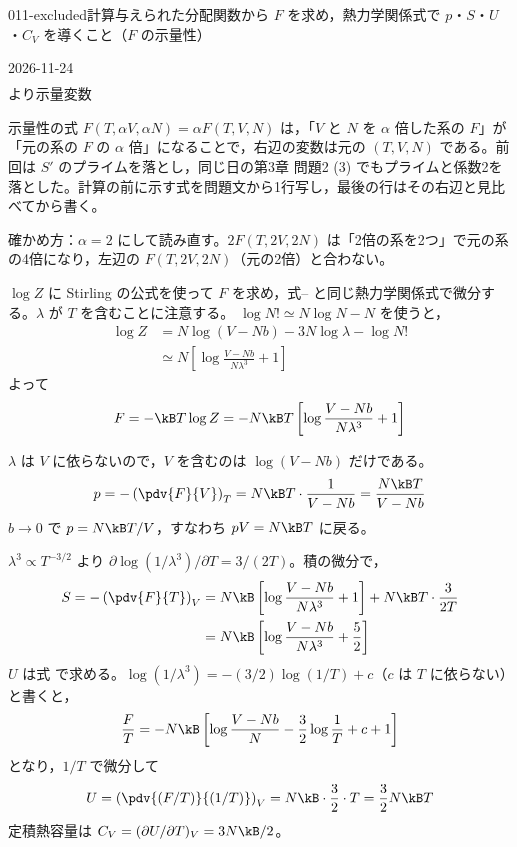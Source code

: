 \documentclass[uplatex,dvipdfmx,a4paper,11pt]{jsarticle}
\begin{document}
\begin{mondai}{011-excluded}{計算}{与えられた分配関数から $F$ を求め，熱力学関係式で $p$・$S$・$U$・$C_{V}$ を導くこと（$F$ の示量性）}
\begin{kotaeutsushi}{2026-11-24}
\begin{align*}
\end{align*}
より示量変数
\end{kotaeutsushi}
\begin{kizuki}
\item {} 示量性の式 $F(T,\alpha V,\alpha N)=\alpha F(T,V,N)$ は，「$V$ と $N$ を $\alpha$ 倍した系の $F$」が「元の系の $F$ の $\alpha$ 倍」になることで，右辺の変数は元の $(T,V,N)$ である。前回は $S'$ のプライムを落とし，同じ日の第3章 問題2 (3) でもプライムと係数2を落とした。計算の前に示す式を問題文から1行写し，最後の行はその右辺と見比べてから書く。
\item 確かめ方：$\alpha=2$ にして読み直す。$2F(T,2V,2N)$ は「2倍の系を2つ」で元の系の4倍になり，左辺の $F(T,2V,2N)$（元の2倍）と合わない。
\end{kizuki}
\begin{tadashii}
\houshin $\log Z$ に Stirling の公式を使って $F$ を求め，式-- と同じ熱力学関係式で微分する。$\lambda$ が $T$ を含むことに注意する。
\keisan
{} $\log N!\simeq N\log N-N$ を使うと，
\begin{align*}
\log Z&=N\log(V-Nb)-3N\log\lambda-\log N!\\
&\simeq N\left[\log\frac{V-Nb}{N\lambda^{3}}+1\right]
\end{align*}
よって
\[F=-\kB T\log Z=-N\kB T\left[\log\frac{V-Nb}{N\lambda^{3}}+1\right]\]

 $\lambda$ は $V$ に依らないので，$V$ を含むのは $\log(V-Nb)$ だけである。
\[p=-\left(\pdv{F}{V}\right)_{T}=N\kB T\cdot\frac{1}{V-Nb}=\frac{N\kB T}{V-Nb}\]
$b\to0$ で $p=N\kB T/V$，すなわち $pV=N\kB T$ に戻る。

 $\lambda^{3}\propto T^{-3/2}$ より $\partial\log(1/\lambda^{3})/\partial T=3/(2T)$。積の微分で，
\begin{align*}
S=-\left(\pdv{F}{T}\right)_{V}&=N\kB\left[\log\frac{V-Nb}{N\lambda^{3}}+1\right]+N\kB T\cdot\frac{3}{2T}\\
&=N\kB\left[\log\frac{V-Nb}{N\lambda^{3}}+\frac{5}{2}\right]
\end{align*}
$U$ は式 で求める。$\log(1/\lambda^{3})=-(3/2)\log(1/T)+c$（$c$ は $T$ に依らない）と書くと，
\[\frac{F}{T}=-N\kB\left[\log\frac{V-Nb}{N}-\frac{3}{2}\log\frac{1}{T}+c+1\right]\]
となり，$1/T$ で微分して
\[U=\left(\pdv{(F/T)}{(1/T)}\right)_{V}=N\kB\cdot\frac{3}{2}\cdot T=\frac{3}{2}N\kB T\]
定積熱容量は $C_{V}=(\partial U/\partial T)_{V}=3N\kB/2$。


\end{tadashii}
\end{mondai}
\end{document}

